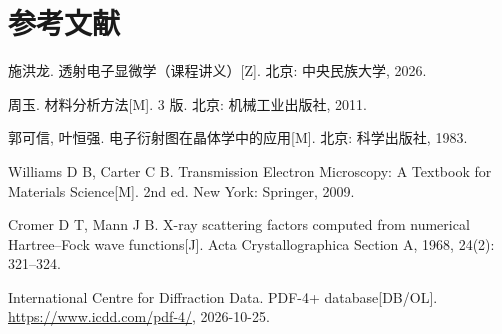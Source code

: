 \section*{参考文献}

\begin{enumerate}[label={[\arabic*]},leftmargin=2.2em,itemsep=1pt]
  \item 施洪龙. 透射电子显微学（课程讲义）[Z]. 北京: 中央民族大学, 2026.
  \item 周玉. 材料分析方法[M]. 3 版. 北京: 机械工业出版社, 2011.
  \item 郭可信, 叶恒强. 电子衍射图在晶体学中的应用[M]. 北京: 科学出版社, 1983.
  \item Williams D B, Carter C B. Transmission Electron Microscopy: A Textbook for Materials Science[M]. 2nd ed. New York: Springer, 2009.
  \item Cromer D T, Mann J B. X-ray scattering factors computed from numerical Hartree--Fock wave functions[J]. Acta Crystallographica Section A, 1968, 24(2): 321--324.
  \item International Centre for Diffraction Data. PDF-4+ database[DB/OL]. \url{https://www.icdd.com/pdf-4/}, 2026-10-25.
\end{enumerate}
